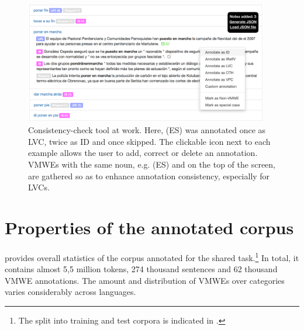 \documentclass[output=paper,
modfonts,
]{langscibook}
\begin{document}
\begin{figure}[ht]
\includegraphics[width=0.95\textwidth]{figures/Validation_ES_bis.png}%
\caption{
Consistency-check tool at work. Here, (ES)  was annotated once as LVC, twice as ID and once skipped. The clickable icon next to each example allows the user to add, correct or delete an annotation. VMWEs with the same noun, e.g. (ES)  and  on the top of the screen, are gathered so as to enhance annotation consistency, especially for LVCs.
}
\label{fig:validationES}
\end{figure}

\section{Properties of the annotated corpus}
\label{sec:corpora}
%
 provides overall statistics of the corpus annotated for the shared task.\footnote{
The split into training and test corpora is indicated in \citet{MWEWorkshop}.} In total, it contains almost 5,5 million tokens, 274 thousand sentences and 62 thousand VMWE annotations. 
The amount and distribution of VMWEs over categories varies considerably across languages.
\end{document}
